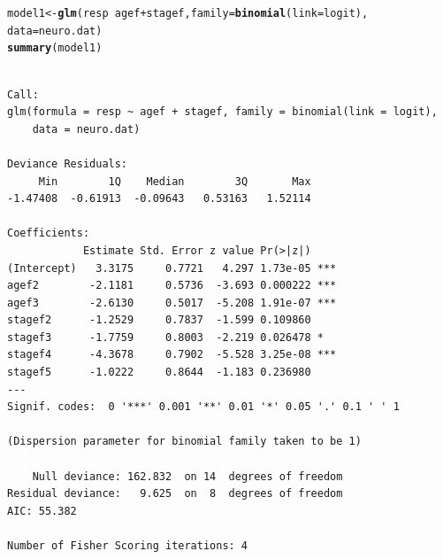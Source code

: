 \documentclass[oneside]{book}\usepackage[]{graphicx}\usepackage[svgnames]{xcolor}
\makeatletter
\newcommand{\hlopt}[1]{\textcolor[rgb]{0,0,0}{#1}}%
\newcommand{\hlstd}[1]{\textcolor[rgb]{0.345,0.345,0.345}{#1}}%
\newcommand{\hlkwb}[1]{\textcolor[rgb]{0.69,0.353,0.396}{#1}}%
\newcommand{\hlkwc}[1]{\textcolor[rgb]{0.333,0.667,0.333}{#1}}%
\newcommand{\hlkwd}[1]{\textcolor[rgb]{0.737,0.353,0.396}{\textbf{#1}}}%
\newenvironment{kframe}{%
 \def\at@end@of@kframe{}%
 \ifinner\ifhmode%
  \def\at@end@of@kframe{\end{minipage}}%
  \begin{minipage}{\columnwidth}%
 \fi\fi%
 \def\FrameCommand##1{\hskip\@totalleftmargin \hskip-\fboxsep
 \colorbox{shadecolor}{##1}\hskip-\fboxsep
     \hskip-\linewidth \hskip-\@totalleftmargin \hskip\columnwidth}%
 \MakeFramed {\advance\hsize-\width
   \@totalleftmargin\z@ \linewidth\hsize
   \@setminipage}}%
 {\par\unskip\endMakeFramed%
 \at@end@of@kframe}
\newenvironment{knitrout}{}{} %
\makeatother
\begin{document}
\begin{knitrout}
\color{fgcolor}\begin{kframe}
\begin{alltt}
\hlstd{model1} \hlkwb{<-} \hlkwd{glm}\hlstd{(resp} \hlopt{~} \hlstd{agef} \hlopt{+} \hlstd{stagef,} \hlkwc{family} \hlstd{=} \hlkwd{binomial}\hlstd{(}\hlkwc{link} \hlstd{= logit),}
  \hlkwc{data} \hlstd{= neuro.dat)}
\hlkwd{summary}\hlstd{(model1)}
\end{alltt}
\begin{verbatim}

Call:
glm(formula = resp ~ agef + stagef, family = binomial(link = logit), 
    data = neuro.dat)

Deviance Residuals: 
     Min        1Q    Median        3Q       Max  
-1.47408  -0.61913  -0.09643   0.53163   1.52114  

Coefficients:
            Estimate Std. Error z value Pr(>|z|)    
(Intercept)   3.3175     0.7721   4.297 1.73e-05 ***
agef2        -2.1181     0.5736  -3.693 0.000222 ***
agef3        -2.6130     0.5017  -5.208 1.91e-07 ***
stagef2      -1.2529     0.7837  -1.599 0.109860    
stagef3      -1.7759     0.8003  -2.219 0.026478 *  
stagef4      -4.3678     0.7902  -5.528 3.25e-08 ***
stagef5      -1.0222     0.8644  -1.183 0.236980    
---
Signif. codes:  0 '***' 0.001 '**' 0.01 '*' 0.05 '.' 0.1 ' ' 1

(Dispersion parameter for binomial family taken to be 1)

    Null deviance: 162.832  on 14  degrees of freedom
Residual deviance:   9.625  on  8  degrees of freedom
AIC: 55.382

Number of Fisher Scoring iterations: 4
\end{verbatim}
\end{kframe}
\end{knitrout}
\end{document}

